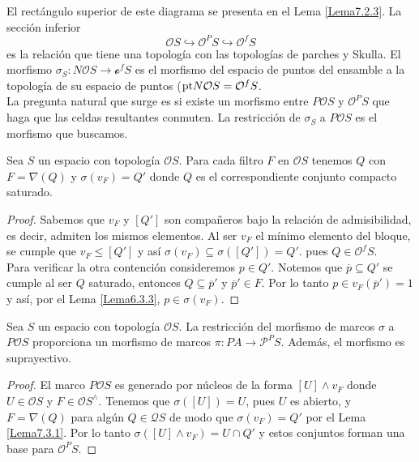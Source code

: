 El rectángulo superior de este diagrama se presenta en el Lema \ref{Lema7.2.3}. La sección inferior
\[
\mathcal{O}S\hookrightarrow \mathcal{O}^PS\hookrightarrow \mathcal{O}^fS
\]
es la relación que tiene una topología con las topologías de parches y Skulla. El morfismo $\sigma_S\colon N\mathcal{O}S\to \mathcal{o}^fS$ es el morfismo del espacio de puntos del ensamble a la topología de su espacio de puntos ($\mathrm{pt} N\mathcal{O}S=\mathcal{O}^fS$.\\

La pregunta natural que surge es si existe un morfismo entre $P\mathcal{O}S$ y $\mathcal{O}^PS$ que haga que las celdas resultantes conmuten. La restricción de $\sigma_S$ a $P\mathcal{O}S$ es el morfismo que buscamos.

\begin{lem}\label{Lema7.3.1}
    Sea $S$ un espacio con topología $\mathcal{O}S$. Para cada filtro $F$ en $\mathcal{O}S$ tenemos $Q$ con $F=\nabla(Q)$ y $\sigma(v_F)=Q'$ donde $Q$ es el correspondiente conjunto compacto saturado.
\end{lem}

\begin{proof}
    Sabemos que $v_F$ y $[Q']$ son compañeros bajo la relación de admisibilidad, es decir, admiten los mismos elementos. Al ser $v_F$ el mínimo elemento del bloque, se cumple que $v_F\leq [Q']$ y así $\sigma(v_F)\subseteq \sigma([Q'])=Q'$. pues $Q\in \mathcal{O}^fS$.\\

    Para verificar la otra contención consideremos $p\in Q'$. Notemos que $\overline{p}\subseteq Q'$ se cumple al ser $Q$ saturado, entonces $Q\subseteq \overline{p}'$ y $\overline{p}'\in F$. Por lo tanto $p\in v_F(\overline{p}')=1$ y así, por el Lema \ref{Lema6.3.3}, $p\in \sigma(v_F)$.
\end{proof}

\begin{lem}\label{Lema7.3.2}
    Sea $S$ un espacio con topología $\mathcal{O}S$. La restricción del morfismo de marcos $\sigma$ a $P\mathcal{O}S$ proporciona un morfismo de marcos $\pi\colon PA\to \mathcal{P}^PS$. Además, el morfismo es suprayectivo.
\end{lem}

\begin{proof}
    El marco $P\mathcal{O}S$ es generado por núcleos de la forma $[U]\wedge v_F$ donde $U\in \mathcal{O}S$ y $F\in \mathcal{O}S^\wedge$. Tenemos que $\sigma([U])=U$, pues $U$ es abierto, y $F=\nabla(Q)$ para algún $Q\in \mathcal{Q}S$ de modo que $\sigma(v_F)=Q'$ por el Lema \ref{Lema7.3.1}. Por lo tanto $\sigma([U]\wedge v_F)=U\cap Q'$ y estos conjuntos forman una base para $\mathcal{O}^PS$.
\end{proof}

